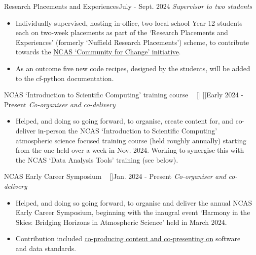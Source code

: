 
\begin{projects}

\projecta
	{Research Placements and Experiences}{July - Sept. 2024}
	{
	    \textit{Supervisor to two students}
	}
	{\begin{itemize}
     \item Individually supervised, hosting in-office, two local school Year 12 students each on two-week placements as part of the `Research Placements and Experiences' (formerly `Nuffield Research Placements') scheme, to contribute towards the \href{https://ncas.ac.uk/for-staff/change/}{NCAS `Community for Change' initiative}.
     \item As an outcome five new code recipes, designed by the students, will be added to the cf-python documentation.
     \end{itemize}}

\projecta
	{NCAS `Introduction to Scientific Computing' training course ~ [\href{https://ncas.ac.uk/study-with-us/introduction-to-scientific-computing/}{\small{\websiteSymbol}}] [\href{https://github.com/ncasuk/ncas-isc}{\small{\githubSymbol}}]}{Early 2024 - Present}
	{
	    \textit{Co-organiser and co-delivery}
	}
	{\begin{itemize}
     \item Helped, and doing so going forward, to organise, create content for, and co-deliver in-person the NCAS `Introduction to Scientific Computing' atmospheric science focused training course (held roughly annually) starting from the one held over a week in Nov. 2024. Working to synergise this with the NCAS `Data Analysis Tools’ training (see below).
     \end{itemize}}
     
\projecta
	{NCAS Early Career Symposium ~ [\href{https://sites.google.com/ncas.ac.uk/ncasharmonyintheskies/home}{\small{\websiteSymbol}}]}{Jan. 2024 - Present}
	{
	    \textit{Co-organiser and co-delivery}
	}
	{\begin{itemize}
     \item Helped, and doing so going forward, to organise and deliver the annual NCAS Early Career Symposium, beginning with the inaugral event `Harmony in the Skies: Bridging Horizons in Atmospheric Science' held in March 2024.
     \item Contribution included \href{https://github.com/sadielbartholomew/sadielbartholomew/blob/master/talks-and-workshops/ncas-ec-symposium-software-data.pdf}{co-producing content and co-presenting on} software and data standards.
     \end{itemize}}

\end{projects}
